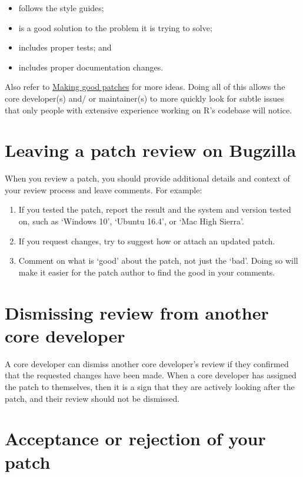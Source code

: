 \documentclass[
]{book}
\begin{document}
\begin{itemize}
\item
  follows the style guides;
\item
  is a good solution to the problem it is trying to solve;
\item
  includes proper tests; and
\item
  includes proper documentation changes.
\end{itemize}

Also refer to \hyperref[GoodPatches]{Making good patches} for more ideas. Doing all of this allows the core developer(s) and/ or maintainer(s) to more quickly look for subtle issues that only people with extensive experience working on R's codebase will notice.

\section{Leaving a patch review on Bugzilla}\label{leaving-a-patch-review-on-bugzilla}

When you review a patch, you should provide additional details and context of your review process and leave comments. For example:

\begin{enumerate}
\def\labelenumi{\arabic{enumi}.}
\item
  If you tested the patch, report the result and the system and version tested on, such as `Windows 10', `Ubuntu 16.4', or `Mac High Sierra'.
\item
  If you request changes, try to suggest how or attach an updated patch.
\item
  Comment on what is `good' about the patch, not just the `bad'. Doing so will make it easier for the patch author to find the good in your comments.
\end{enumerate}

\section{Dismissing review from another core developer}\label{dismissing-review-from-another-core-developer}

A core developer can dismiss another core developer's review if they confirmed that the requested changes have been made. When a core developer has assigned the patch to themselves, then it is a sign that they are actively looking after the patch, and their review should not be dismissed.

\section{Acceptance or rejection of your patch}\label{acceptance-or-rejection-of-your-patch}
\end{document}
